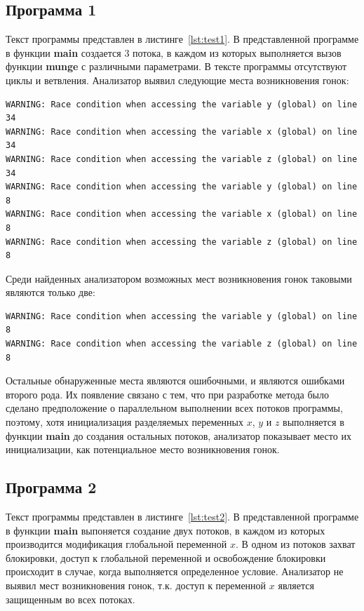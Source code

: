 \subsection{Программа 1}

Текст программы представлен в листинге~\ref{lst:test1}. В представленной программе в функции \textbf{main} создается 3 потока, в каждом из которых выполняется вызов функции \textbf{munge} с различными параметрами. В тексте программы отсутствуют циклы и ветвления. Анализатор выявил следующие места возникновения гонок:
\begin{verbatim}
WARNING: Race condition when accessing the variable y (global) on line 34
WARNING: Race condition when accessing the variable x (global) on line 34
WARNING: Race condition when accessing the variable z (global) on line 34
WARNING: Race condition when accessing the variable y (global) on line 8
WARNING: Race condition when accessing the variable x (global) on line 8
WARNING: Race condition when accessing the variable z (global) on line 8
\end{verbatim}
Среди найденных анализатором возможных мест возникновения гонок таковыми являются только две:
\begin{verbatim}
WARNING: Race condition when accessing the variable y (global) on line 8
WARNING: Race condition when accessing the variable z (global) on line 8
\end{verbatim}
Остальные обнаруженные места являются ошибочными, и являются ошибками второго рода. Их появление связано с тем, что при разработке метода было сделано предположение о параллельном выполнении всех потоков программы, поэтому, хотя инициализация разделяемых переменных $x$, $y$ и $z$ выполняется в функции \textbf{main} до создания остальных потоков, анализатор показывает место их инициализации, как потенциальное место возникновения гонок.



\subsection{Программа 2}

Текст программы представлен в листинге~\ref{lst:test2}. В представленной программе в функции \textbf{main} выпоняется создание двух потоков, в каждом из которых производится модификация глобальной переменной $x$. В одном из потоков захват блокировки, доступ к глобальной переменной и освобождение блокировки происходит в случае, когда выполняется определенное условие. Анализатор не выявил мест возникновения гонок, т.к. доступ к переменной $x$ является защищенным во всех потоках.

